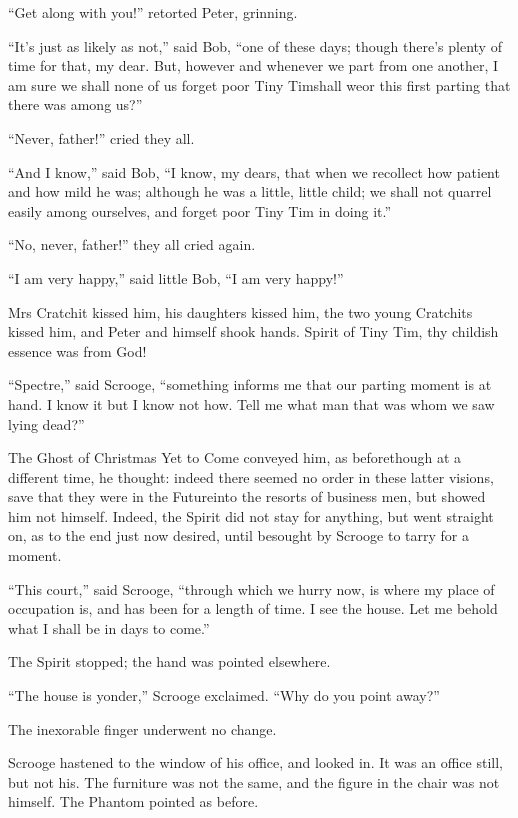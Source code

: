 \documentclass[paper=5.5in:8.5in,BCOR=7mm,twoside,DIV=calc,12pt,usegeometry]{scrbook} %
\begin{document}
\enquote{Get along with you!} retorted Peter, grinning.

\enquote{It's just as likely as not,} said Bob, \enquote{one of these days; though there's plenty of time for that, my dear. But, however and whenever we part from one another, I am sure we shall none of us forget poor Tiny Tim\textemdash shall we\textemdash or this first parting that there was among us?}

\enquote{Never, father!} cried they all.

\enquote{And I know,} said Bob, \enquote{I know, my dears, that when we recollect how patient and how mild he was; although he was a little, little child; we shall not quarrel easily among ourselves, and forget poor Tiny Tim in doing it.}

\enquote{No, never, father!} they all cried again.

\enquote{I am very happy,} said little Bob, \enquote{I am very happy!}

Mrs Cratchit kissed him, his daughters kissed him, the two young Cratchits kissed him, and Peter and himself shook hands. Spirit of Tiny Tim, thy childish essence was from God!

\enquote{Spectre,} said Scrooge, \enquote{something informs me that our parting moment is at hand. I know it but I know not how. Tell me what man that was whom we saw lying dead?}

The Ghost of Christmas Yet to Come conveyed him, as before\textemdash though at a different time, he thought: indeed there seemed no order in these latter visions, save that they were in the Future\textemdash into the resorts of business men, but showed him not himself. Indeed, the Spirit did not stay for anything, but went straight on, as to the end just now desired, until besought by Scrooge to tarry for a moment.

\enquote{This court,} said Scrooge, \enquote{through which we hurry now, is where my place of occupation is, and has been for a length of time. I see the house. Let me behold what I shall be in days to come.}

The Spirit stopped; the hand was pointed elsewhere.

\enquote{The house is yonder,} Scrooge exclaimed. \enquote{Why do you point away?}

The inexorable finger underwent no change.

Scrooge hastened to the window of his office, and looked in. It was an office still, but not his. The furniture was not the same, and the figure in the chair was not himself. The Phantom pointed as before.
\end{document}
